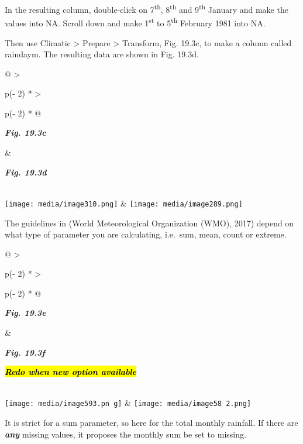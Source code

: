 \documentclass[
  letterpaper,
  DIV=11,
  numbers=noendperiod]{scrreprt}
\begin{document}
In the resulting column, double-click on 7\textsuperscript{th},
8\textsuperscript{th} and 9\textsuperscript{th} January and make the
values into NA. Scroll down and make 1\textsuperscript{st} to
5\textsuperscript{th} February 1981 into NA.

Then use Climatic \textgreater{} Prepare \textgreater{} Transform, Fig.
19.3c, to make a column called raindaym. The resulting data are shown in
Fig. 19.3d.

\begin{longtable}[]{@{}
  >{\raggedright\arraybackslash}p{(\columnwidth - 2\tabcolsep) * }
  >{\raggedright\arraybackslash}p{(\columnwidth - 2\tabcolsep) * }@{}}
\toprule\noalign{}
\begin{minipage}[b]{\linewidth}\raggedright
\textbf{\emph{Fig. 19.3c}}
\end{minipage} & \begin{minipage}[b]{\linewidth}\raggedright
\textbf{\emph{Fig. 19.3d}}
\end{minipage} \\
\midrule\noalign{}
\endhead
\bottomrule\noalign{}
\endlastfoot
\texttt{[image: media/image310.png]} &
\texttt{[image: media/image289.png]} \\
\end{longtable}

The guidelines in (World Meteorological Organization (WMO), 2017) depend
on what type of parameter you are calculating, i.e.~sum, mean, count or
extreme.

\begin{longtable}[]{@{}
  >{\raggedright\arraybackslash}p{(\columnwidth - 2\tabcolsep) * }
  >{\raggedright\arraybackslash}p{(\columnwidth - 2\tabcolsep) * }@{}}
\toprule\noalign{}
\begin{minipage}[b]{\linewidth}\raggedright
\textbf{\emph{Fig. 19.3e}}
\end{minipage} & \begin{minipage}[b]{\linewidth}\raggedright
\textbf{\emph{Fig. 19.3f}}

\textbf{\emph{\hl{Redo when new option available}}}
\end{minipage} \\
\midrule\noalign{}
\endhead
\bottomrule\noalign{}
\endlastfoot
\texttt{[image: media/image593.pn g]}
&
\texttt{[image: media/image58 2.png]} \\
\end{longtable}

It is strict for a sum parameter, so here for the total monthly
rainfall. If there are \textbf{\emph{any}} missing values, it proposes
the monthly sum be set to missing.
\end{document}
